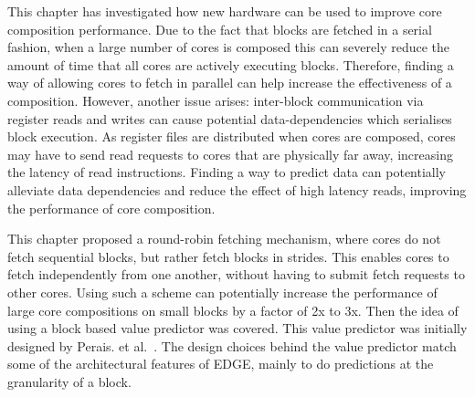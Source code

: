 This chapter has investigated how new hardware can be used to improve core composition performance.
Due to the fact that blocks are fetched in a serial fashion, when a large number of cores is composed this can severely reduce the amount of time that all cores are actively executing blocks.
Therefore, finding a way of allowing cores to fetch in parallel can help increase the effectiveness of a composition.
However, another issue arises: inter-block communication via register reads and writes can cause potential data-dependencies which serialises block execution.
As register files are distributed when cores are composed, cores may have to send read requests to cores that are physically far away, increasing the latency of read instructions.
Finding a way to predict data can potentially alleviate data dependencies and reduce the effect of high latency reads, improving the performance of core composition.

This chapter proposed a round-robin fetching mechanism, where cores do not fetch sequential blocks, but rather fetch blocks in strides.
This enables cores to fetch independently from one another, without having to submit fetch requests to other cores.
Using such a scheme can potentially increase the performance of large core compositions on small blocks by a factor of 2x to 3x.
Then the idea of using a block based value predictor was covered.
This value predictor was initially designed by Perais. et al.~\cite{peraisVTAGE2014, peraisBeBop2015}.
The design choices behind the value predictor match some of the architectural features of EDGE, mainly to do predictions at the granularity of a block.

